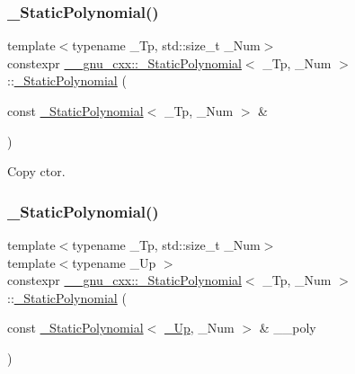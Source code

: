 \subsubsection{\texorpdfstring{\+\_\+\+Static\+Polynomial()}{\_StaticPolynomial()}\hspace{0.1cm}{\footnotesize\ttfamily [2/7]}}
{\footnotesize\ttfamily template$<$typename \+\_\+\+Tp, std\+::size\+\_\+t \+\_\+\+Num$>$ \\
constexpr \hyperlink{class____gnu__cxx_1_1__StaticPolynomial}{\+\_\+\+\_\+gnu\+\_\+cxx\+::\+\_\+\+Static\+Polynomial}$<$ \+\_\+\+Tp, \+\_\+\+Num $>$\+::\hyperlink{class____gnu__cxx_1_1__StaticPolynomial}{\+\_\+\+Static\+Polynomial} (\begin{DoxyParamCaption}\item[{const \hyperlink{class____gnu__cxx_1_1__StaticPolynomial}{\+\_\+\+Static\+Polynomial}$<$ \+\_\+\+Tp, \+\_\+\+Num $>$ \&}]{ }\end{DoxyParamCaption})\hspace{0.3cm}{\ttfamily [default]}}

Copy ctor. \mbox{\label{class____gnu__cxx_1_1__StaticPolynomial_a1a605cf13d0f2c5c544ef44f785ef544}} 
\subsubsection{\texorpdfstring{\+\_\+\+Static\+Polynomial()}{\_StaticPolynomial()}\hspace{0.1cm}{\footnotesize\ttfamily [3/7]}}
{\footnotesize\ttfamily template$<$typename \+\_\+\+Tp, std\+::size\+\_\+t \+\_\+\+Num$>$ \\
template$<$typename \+\_\+\+Up $>$ \\
constexpr \hyperlink{class____gnu__cxx_1_1__StaticPolynomial}{\+\_\+\+\_\+gnu\+\_\+cxx\+::\+\_\+\+Static\+Polynomial}$<$ \+\_\+\+Tp, \+\_\+\+Num $>$\+::\hyperlink{class____gnu__cxx_1_1__StaticPolynomial}{\+\_\+\+Static\+Polynomial} (\begin{DoxyParamCaption}\item[{const \hyperlink{class____gnu__cxx_1_1__StaticPolynomial}{\+\_\+\+Static\+Polynomial}$<$ \hyperlink{namespace____gnu__cxx_ab693ea357b6429b331e0bf09f9442385}{\+\_\+\+Up}, \+\_\+\+Num $>$ \&}]{\+\_\+\+\_\+poly }\end{DoxyParamCaption})\hspace{0.3cm}{\ttfamily [inline]}}



